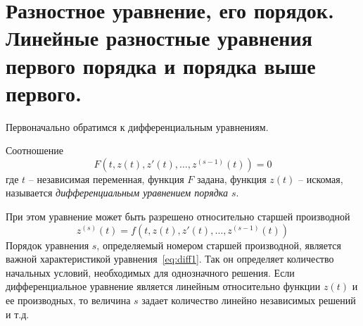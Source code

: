 \documentclass[../../calc-math-exam-2023.tex]{subfiles}
\begin{document}
    \section{Разностное уравнение, его порядок. Линейные разностные уравнения первого порядка и порядка выше первого.}\label{sec:ch03}
    Первоначально обратимся к дифференциальным уравнениям.
    \begin{definition}
        Соотношение
        \begin{equation*}
            F \left( t, z(t), z'(t), \dots, z^{(s-1)}(t) \right) = 0
        \end{equation*}
        где $t$ -- независимая переменная, функция $F$ задана, функция $z(t)$ -- искомая,
        называется \emph{дифференциальным уравнением порядка $s$}.
    \end{definition}
    При этом уравнение может быть разрешено относительно старшей производной
    \begin{equation}
        z^{(s)}(t) = f\left( t, z(t), z'(t), \dots, z^{(s-1)}(t) \right)\label{eq:diff1}
    \end{equation}
    Порядок уравнения $s$, определяемый номером старшей производной, является важной
    характеристикой уравнения~\eqref{eq:diff1}. Так он определяет количество начальных
    условий, необходимых для однозначного решения. Если дифференциальное уравнение является
    линейным относительно функции $z(t)$ и ее производных, то величина $s$ задает
    количество линейно независимых решений и т.д.
\end{document}
